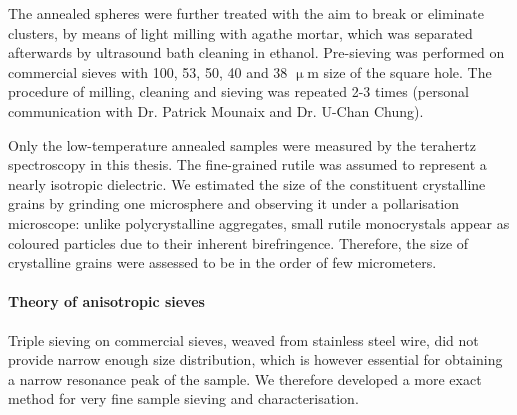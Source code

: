 The annealed spheres were further treated with the aim to break or eliminate clusters, by means of light milling with agathe mortar, which was separated afterwards by ultrasound bath cleaning in ethanol. Pre-sieving was performed on commercial sieves with 100, 53, 50, 40 and 38 $\upmu$m size of the square hole. The procedure of milling, cleaning and sieving was repeated 2-3 times (personal communication with Dr. Patrick Mounaix and {Dr.} U-Chan Chung).

Only the low-temperature annealed samples were measured by the terahertz spectroscopy in this thesis. The fine-grained rutile was assumed to represent a nearly isotropic dielectric. We estimated the size of the constituent crystalline grains by grinding one microsphere and observing it under a pollarisation microscope: unlike polycrystalline aggregates, small rutile monocrystals appear as coloured particles due to their inherent birefringence. Therefore, the size of crystalline grains were assessed to be in the order of few micrometers.



\paragraph{Theory of anisotropic sieves}%
Triple sieving on commercial sieves, weaved from stainless steel wire, did not provide narrow enough size distribution, which is however essential for obtaining a narrow resonance peak of the sample. We therefore developed a more exact method for very fine sample sieving and characterisation. 

